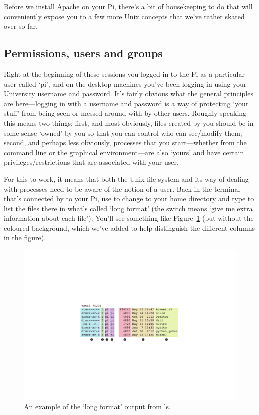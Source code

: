 Before we install Apache on your Pi, there's a bit of housekeeping to do that will conveniently expose you to a few more Unix concepts that we've rather skated over so far.

\subsection{Permissions, users and groups}

Right at the beginning of these sessions you logged in to the Pi as a particular user called `pi', and on the desktop machines you've been logging in using your University username and password. It's fairly obvious what the general principles are here---logging in with a username and password is a way of protecting `your stuff' from being seen or messed around with by other users. Roughly speaking this means two things: first, and most obviously, files created by you should be in some sense `owned' by you so that you can control who can see/modify them; second, and perhaps less obviously, processes that you start---whether from the command line or the graphical environment---are also `yours' and have certain privileges/restrictions that are associated with your user.

For this to work, it means that both the Unix file system and its way of dealing with processes need to be aware of the notion of a user. Back in the terminal that's connected by  to your Pi, use  to change to your home directory and type  to list the files there in what's called `long format' (the  switch means `give me extra information about each file'). You'll see something like Figure~\ref{figure:longformls} (but without the coloured background, which we've added to help distinguish the different columns in the figure).

\begin{figure}
\centerline{\includegraphics[width=14cm]{images/longformls}}
\caption{An example of the `long format' output from ls.}\label{figure:longformls}
\end{figure}

